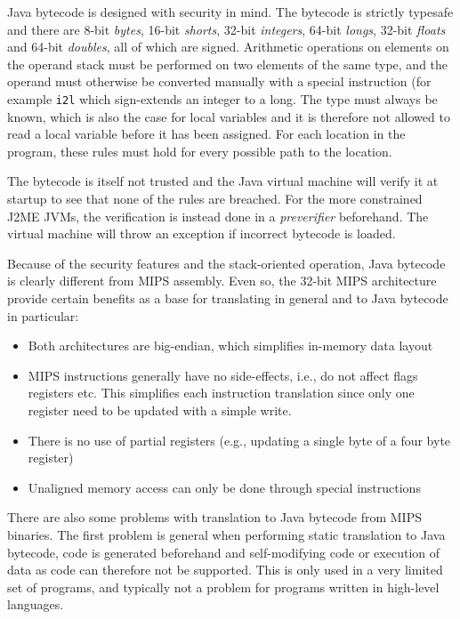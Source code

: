 Java bytecode is designed with security in mind. The bytecode is strictly
typesafe and there are 8-bit \emph{bytes}, 16-bit \emph{shorts}, 32-bit
\emph{integers}, 64-bit \emph{longs}, 32-bit \emph{floats} and 64-bit
\emph{doubles}, all of which are signed. Arithmetic operations on elements on
the operand stack must be performed on two elements of the same type, and the
operand must otherwise be converted manually with a special instruction (for
example \texttt{i2l} which sign-extends an integer to a long. The type must
always be known, which is also the case for local variables and it is
therefore not allowed to read a local variable before it has been assigned.
For each location in the program, these rules must hold for every possible
path to the location.

The bytecode is itself not trusted and the Java virtual machine will verify it
at startup to see that none of the rules are breached. For the more
constrained J2ME JVMs, the verification is instead done in a
\emph{preverifier} beforehand. The virtual machine will throw an exception if
incorrect bytecode is loaded.

Because of the security features and the stack-oriented operation, Java
bytecode is clearly different from MIPS assembly. Even so, the 32-bit MIPS
architecture provide certain benefits as a base for translating in general and
to Java bytecode in particular:

\begin{itemize}
\item Both architectures are big-endian, which simplifies in-memory data
  layout
\item MIPS instructions generally have no side-effects, i.e., do not affect
  flags registers etc. This simplifies each instruction translation since only
  one register need to be updated with a simple write.
\item There is no use of partial registers (e.g., updating a single byte of a
  four byte register)
\item Unaligned memory access can only be done through special instructions
\end{itemize}

There are also some problems with translation to Java bytecode from MIPS
binaries. The first problem is general when performing static translation to
Java bytecode, code is generated beforehand and self-modifying code or
execution of data as code can therefore not be supported. This is only used in
a very limited set of programs, and typically not a problem for programs
written in high-level languages.

